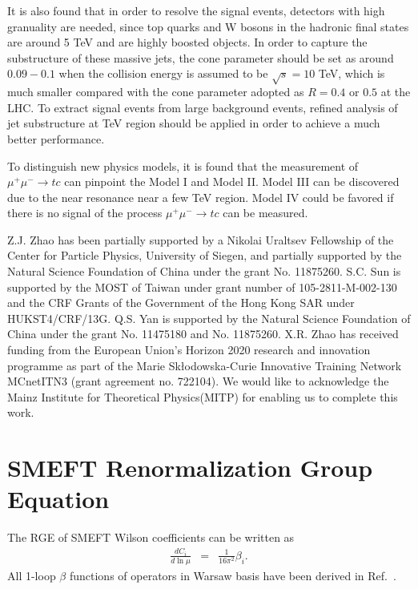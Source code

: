 \documentclass[a4paper,11pt]{article}
\begin{document}
It is also found that in order to resolve the signal events, detectors with high granuality are needed, since top quarks and W bosons in the hadronic final states are around 5 TeV and are highly boosted objects. In order to capture the substructure of these massive jets, the cone parameter should be set as around  $0.09-0.1$ when the collision energy is assumed to be $\sqrt{s}=10$ TeV, which is much smaller compared with the cone parameter adopted as $R=0.4$ or $0.5$ at the LHC. To extract signal events from large background events, refined analysis of jet substructure at TeV region should be applied in order to achieve a much better performance.

To distinguish new physics models, it is found that the measurement of  $\mu^+ \mu^- \to tc$ can pinpoint the Model I and Model II. Model III can be discovered due to the near resonance near a few TeV region. Model IV could be favored if there is no signal of the process $\mu^+ \mu^- \to t c$ can be measured.

	\begin{acknowledgments}
                Z.J. Zhao has been partially supported by a
		Nikolai Uraltsev Fellowship of the Center for Particle Physics,
		University of Siegen, and partially supported by the Natural Science
		Foundation of China under the grant No. 11875260. 
		S.C. Sun is supported by the MOST of Taiwan
		under grant number of 105-2811-M-002-130 and the CRF Grants of the
		Government of the Hong Kong SAR under HUKST4/CRF/13G.  Q.S. Yan 
		is supported by the Natural Science Foundation of China
		under the grant No.  11475180 and No. 11875260.
		X.R. Zhao has received funding from the European Union's Horizon 2020 research 
		and innovation programme as part of the 
		Marie Sk{\l}odowska-Curie Innovative Training Network MCnetITN3 (grant agreement no. 722104).
		We would like to acknowledge the Mainz Institute for Theoretical Physics(MITP) for enabling us to complete this work.

	\end{acknowledgments}

\appendix
	



\section{SMEFT Renormalization Group Equation}\label{smeftrge}
The RGE of SMEFT Wilson coefficients can be written as 
\begin{eqnarray}
  \frac{dC_i}{d\ln{\mu}} &=& \frac{1}{16\pi^2}\beta_i. \label{beta:definition}
\end{eqnarray}
All 1-loop $\beta$ functions of operators in Warsaw basis have been derived in Ref.~\cite{Celis:2017hod}. 
\end{document}
